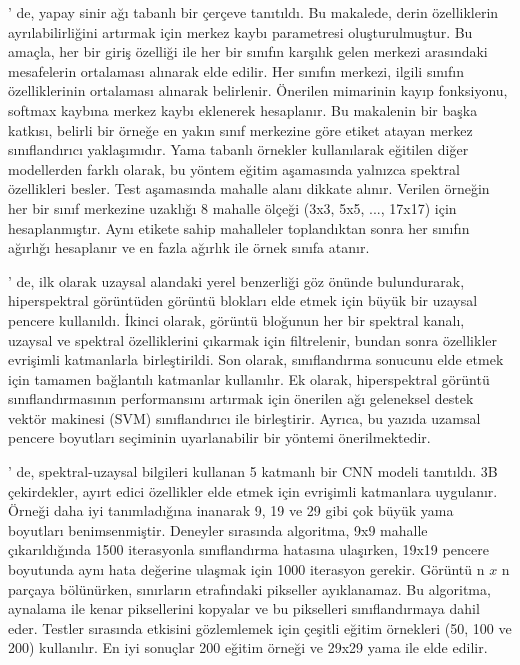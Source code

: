 \citep{guo2018spectral}' de, yapay sinir ağı tabanlı bir çerçeve tanıtıldı. Bu makalede, derin özelliklerin ayrılabilirliğini artırmak için merkez kaybı parametresi oluşturulmuştur. Bu amaçla, her bir giriş özelliği ile her bir sınıfın karşılık gelen merkezi arasındaki mesafelerin ortalaması alınarak elde edilir. Her sınıfın merkezi, ilgili sınıfın özelliklerinin ortalaması alınarak belirlenir. Önerilen mimarinin kayıp fonksiyonu, softmax kaybına merkez kaybı eklenerek hesaplanır. Bu makalenin bir başka katkısı, belirli bir örneğe en yakın sınıf merkezine göre etiket atayan merkez sınıflandırıcı yaklaşımıdır. Yama tabanlı örnekler kullanılarak eğitilen diğer modellerden farklı olarak, bu yöntem eğitim aşamasında yalnızca spektral özellikleri besler. Test aşamasında mahalle alanı dikkate alınır. Verilen örneğin her bir sınıf merkezine uzaklığı 8 mahalle ölçeği (3x3, 5x5, ..., 17x17) için hesaplanmıştır. Aynı etikete sahip mahalleler toplandıktan sonra her sınıfın ağırlığı hesaplanır ve en fazla ağırlık ile örnek sınıfa atanır.

\citep{chen2018hyperspectral}' de, ilk olarak uzaysal alandaki yerel benzerliği göz önünde bulundurarak, hiperspektral görüntüden görüntü blokları elde etmek için büyük bir uzaysal pencere kullanıldı.
İkinci olarak, görüntü bloğunun her bir spektral kanalı, uzaysal ve spektral özelliklerini çıkarmak için filtrelenir, bundan sonra özellikler evrişimli katmanlarla birleştirildi.
Son olarak, sınıflandırma sonucunu elde etmek için tamamen bağlantılı katmanlar kullanılır.
Ek olarak, hiperspektral görüntü sınıflandırmasının performansını artırmak için önerilen ağı geleneksel destek vektör makinesi (SVM) sınıflandırıcı ile birleştirir. Ayrıca, bu yazıda uzamsal pencere boyutları seçiminin uyarlanabilir bir yöntemi önerilmektedir. 

\citep{paoletti2018new}' de, spektral-uzaysal bilgileri kullanan 5 katmanlı bir CNN modeli tanıtıldı. 3B çekirdekler, ayırt edici özellikler elde etmek için evrişimli katmanlara uygulanır. Örneği daha iyi tanımladığına inanarak 9, 19 ve 29 gibi çok büyük yama boyutları benimsenmiştir. Deneyler sırasında algoritma, 9x9 mahalle çıkarıldığında 1500 iterasyonla sınıflandırma hatasına ulaşırken, 19x19 pencere boyutunda aynı hata değerine ulaşmak için 1000 iterasyon gerekir. Görüntü n $x$ n parçaya bölünürken, sınırların etrafındaki pikseller ayıklanamaz. Bu algoritma, aynalama ile kenar piksellerini kopyalar ve bu pikselleri sınıflandırmaya dahil eder. Testler sırasında etkisini gözlemlemek için çeşitli eğitim örnekleri (50, 100 ve 200) kullanılır. En iyi sonuçlar 200 eğitim örneği ve 29x29 yama ile elde edilir.

